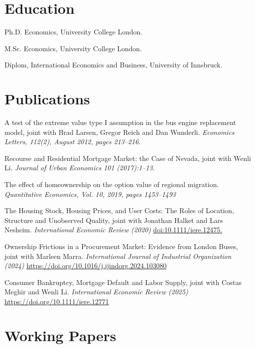 \documentclass[letterpaper]{article}
\renewenvironment{itemize}{
  \begin{list}{}{
    \setlength{\leftmargin}{1.5em}
  }
}{
  \end{list}
}
\begin{document}
\section*{Education}

\begin{itemize}
  \setlength{\itemindent}{26pt}
  \item[2015:] Ph.D. Economics, University College London.
   
  \item[2008:] M.Sc. Economics, University College London.

  \item[2006:] Diplom, International Economics and Business, University of Innsbruck.

\end{itemize}


\section*{Publications}

\begin{itemize}
\item A test of the extreme value type I assumption in the bus engine replacement model, joint with Brad Larsen, Gregor Reich and Dan Wunderli. {\it Economics Letters, 112(2), August 2012, pages 213--216}.
\item Recourse and Residential Mortgage Market: the Case of Nevada, joint with Wenli Li. {\it Journal of Urban Economics 101 (2017):1–13}.
\item The effect of homeownership on the option value of regional migration. {\it Quantitative Economics, Vol. 10, 2019, pages 1453--1493}
\item The Housing Stock, Housing Prices, and User Costs: The Roles of Location, Structure and Unobserved Quality, joint with Jonathan Halket and Lars Nesheim. {\it International Economic Review (2020)} \url{doi:10.1111/iere.12475.}
\item Ownership Frictions in a Procurement Market: Evidence from London Buses, joint with Marleen Marra. {\it International Journal of Industrial Organization (2024)} \url{https://doi.org/10.1016/j.ijindorg.2024.103080}
\item Consumer Bankruptcy, Mortgage Default and Labor Supply, joint with Costas Meghir and Wenli Li. {\it International Economic Review (2025)} \url{https://doi.org/10.1111/iere.12771}
\end{itemize}


\section*{Working Papers}
\end{document}
